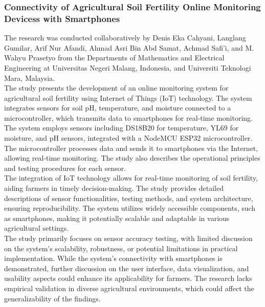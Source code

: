 \documentclass[12pt, a4paper]{article}
\begin{document}
\subsubsection{Connectivity of Agricultural Soil Fertility Online Monitoring Devicess with Smartphones}
The research was conducted collaboratively by Denis Eka Cahyani, Langlang Gumilar, Arif Nur Afandi, Ahmad Asri Bin Abd Samat, Achmad Safi'i, and M. Wahyu Prasetyo from the Departments of Mathematics and Electrical Engineering at Universitas Negeri Malang, Indonesia, and Universiti Teknologi Mara, Malaysia.\\
The study presents the development of an online monitoring system for agricultural soil fertility using Internet of Things (IoT) technology. The system integrates sensors for soil pH, temperature, and moisture connected to a microcontroller, which transmits data to smartphones for real-time monitoring.\\
The system employs sensors including DS18B20 for temperature, YL69 for moisture, and pH sensors, integrated with a NodeMCU ESP32 microcontroller. The microcontroller processes data and sends it to smartphones via the Internet, allowing real-time monitoring. The study also describes the operational principles and testing procedures for each sensor.\\
The integration of IoT technology allows for real-time monitoring of soil fertility, aiding farmers in timely decision-making. The study provides detailed descriptions of sensor functionalities, testing methods, and system architecture, ensuring reproducibility. The system utilizes widely accessible components, such as smartphones, making it potentially scalable and adaptable in various agricultural settings.\\
The study primarily focuses on sensor accuracy testing, with limited discussion on the system's scalability, robustness, or potential limitations in practical implementation. While the system's connectivity with smartphones is demonstrated, further discussion on the user interface, data visualization, and usability aspects could enhance its applicability for farmers. The research lacks empirical validation in diverse agricultural environments, which could affect the generalizability of the findings.
\end{document}
